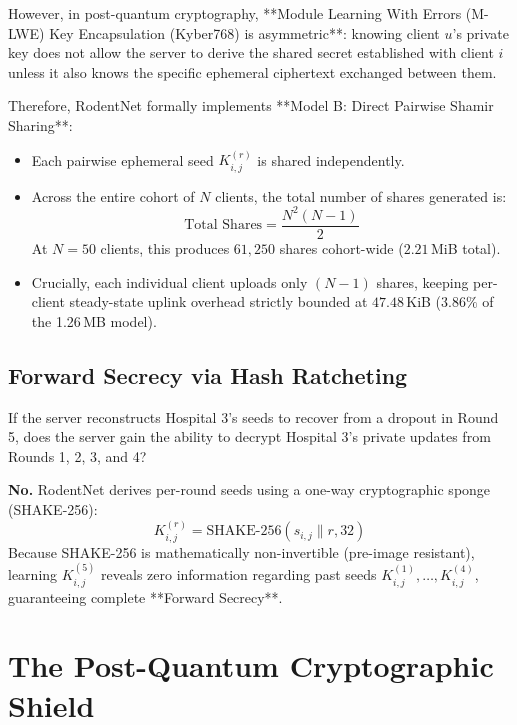 \documentclass[11pt,a4paper]{report}
\begin{document}
However, in post-quantum cryptography, **Module Learning With Errors (M-LWE) Key Encapsulation (Kyber768) is asymmetric**: knowing client $u$'s private key does not allow the server to derive the shared secret established with client $i$ unless it also knows the specific ephemeral ciphertext exchanged between them.

Therefore, RodentNet formally implements **Model B: Direct Pairwise Shamir Sharing**:
\begin{itemize}[itemsep=2pt]
  \item Each pairwise ephemeral seed $K_{i,j}^{(r)}$ is shared independently.
  \item Across the entire cohort of $N$ clients, the total number of shares generated is:
  \begin{equation}
  \text{Total Shares} = \frac{N^2(N-1)}{2}
  \end{equation}
  At $N = 50$ clients, this produces $61{,}250$ shares cohort-wide ($2.21$\,MiB total).
  \item Crucially, each individual client uploads only $(N-1)$ shares, keeping per-client steady-state uplink overhead strictly bounded at $47.48$\,KiB ($3.86\%$ of the 1.26\,MB model).
\end{itemize}

\section{Forward Secrecy via Hash Ratcheting}
If the server reconstructs Hospital 3's seeds to recover from a dropout in Round 5, does the server gain the ability to decrypt Hospital 3's private updates from Rounds 1, 2, 3, and 4?

\textbf{No.} RodentNet derives per-round seeds using a one-way cryptographic sponge (SHAKE-256):
\begin{equation}
K_{i,j}^{(r)} = \text{SHAKE-256}(s_{i,j} \parallel r, 32)
\end{equation}
Because SHAKE-256 is mathematically non-invertible (pre-image resistant), learning $K_{i,j}^{(5)}$ reveals zero information regarding past seeds $K_{i,j}^{(1)}, \dots, K_{i,j}^{(4)}$, guaranteeing complete **Forward Secrecy**.

\chapter{The Post-Quantum Cryptographic Shield}
\label{chap:pqc}
\end{document}
